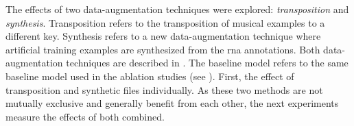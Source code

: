 
The effects of two data-augmentation techniques were
explored: \emph{transposition} and \emph{synthesis}.
Transposition refers to the transposition of musical
examples to a different key. Synthesis refers to a new
data-augmentation technique where artificial training
examples are synthesized from the \gls{rna} annotations.
Both data-augmentation techniques are described in
. The baseline model refers to the
same baseline model used in the ablation studies (see
). First, the effect of
transposition and synthetic files individually. As these two
methods are not mutually exclusive and generally benefit
from each other, the next experiments measure the effects of
both combined. 
